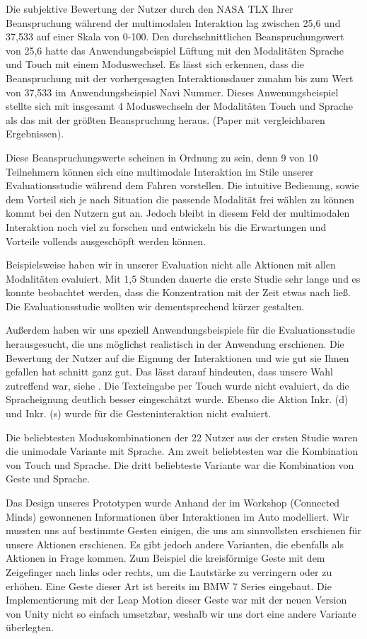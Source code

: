 Die subjektive Bewertung der Nutzer durch den NASA TLX Ihrer Beanspruchung während der multimodalen Interaktion lag zwischen 25,6 und 37,533 auf einer Skala von 0-100. Den durchschnittlichen Beanspruchungswert von 25,6 hatte das Anwendungsbeispiel Lüftung mit den Modalitäten Sprache und Touch mit einem Moduswechsel. Es lässt sich erkennen, dass die Beanspruchung mit der vorhergesagten Interaktionsdauer zunahm bis zum Wert von 37,533 im Anwendungsbeispiel Navi Nummer. Dieses Anwenungsbeispiel stellte sich mit insgesamt 4 Moduswechseln der Modalitäten Touch und Sprache als das mit der größten Beanspruchung heraus. (Paper mit vergleichbaren Ergebnissen). 

Diese Beanspruchungswerte scheinen in Ordnung zu sein, denn 9 von 10 Teilnehmern können sich eine multimodale Interaktion im Stile unserer Evaluationsstudie während dem Fahren vorstellen. Die intuitive Bedienung, sowie dem Vorteil sich je nach Situation die passende Modalität frei wählen zu können kommt bei den Nutzern gut an. Jedoch bleibt in diesem Feld der multimodalen Interaktion noch viel zu forschen und entwickeln bis die Erwartungen und Vorteile vollends ausgeschöpft werden können.

Beispielsweise haben wir in unserer Evaluation nicht alle Aktionen mit allen Modalitäten evaluiert. Mit 1,5 Stunden dauerte die erste Studie sehr lange und es konnte beobachtet werden, dass die Konzentration mit der Zeit etwas nach ließ. Die Evaluationsstudie wollten wir dementsprechend kürzer gestalten. 

Außerdem haben wir uns speziell Anwendungsbeispiele für die Evaluationsstudie herausgesucht, die uns möglichst realistisch in der Anwendung erschienen. Die Bewertung der Nutzer auf die Eignung der Interaktionen und wie gut sie Ihnen gefallen hat schnitt ganz gut. Das lässt darauf hindeuten, dass unsere Wahl zutreffend war, siehe .
Die Texteingabe per Touch wurde nicht evaluiert, da die Spracheignung deutlich besser eingeschätzt wurde. Ebenso die Aktion Inkr. (d) und Inkr. (s) wurde für die Gesteninteraktion nicht evaluiert. 

Die beliebtesten Moduskombinationen der 22 Nutzer aus der ersten Studie waren die unimodale Variante mit Sprache. Am zweit beliebtesten war die Kombination von Touch und Sprache. Die dritt beliebteste Variante war die Kombination von Geste und Sprache. 

Das Design unseres Prototypen wurde Anhand der im Workshop (Connected Minds) gewonnenen Informationen über Interaktionen im Auto modelliert. Wir mussten uns auf bestimmte Gesten einigen, die uns am sinnvollsten erschienen für unsere Aktionen erschienen. Es gibt jedoch andere Varianten, die ebenfalls als Aktionen in Frage kommen. Zum Beispiel die kreisförmige Geste mit dem Zeigefinger nach links oder rechts, um die Lautstärke zu verringern oder zu erhöhen. Eine Geste dieser Art ist bereits im BMW 7 Series eingebaut. Die Implementierung mit der Leap Motion dieser Geste war mit der neuen Version von Unity nicht so einfach umsetzbar, weshalb wir uns dort eine andere Variante überlegten.

